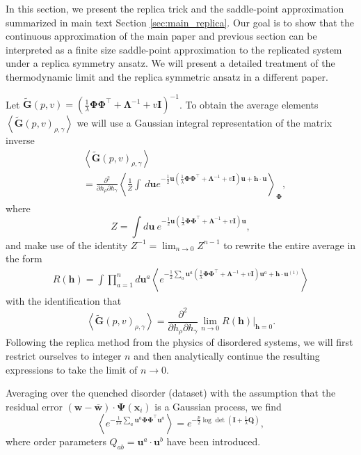 \documentclass{article}
\begin{document}
In this section, we present the replica trick and the saddle-point approximation summarized in main text Section \ref{sec:main_replica}. Our goal is to show that the continuous approximation of the main paper and previous section can be interpreted as a finite size saddle-point approximation to the replicated system under a replica symmetry ansatz. We will present a detailed treatment of the thermodynamic limit and the replica symmetric ansatz in a different paper.


Let $\mathbf{\tilde{G}}(p,v) = \left(\frac{1}{\lambda} \mathbf{\Phi} \mathbf{\Phi}^\top + \mathbf{\Lambda}^{-1} + v \mathbf{I} \right)^{-1}$. 
To obtain the average elements $\left< \mathbf{\tilde{G}}(p,v)_{\rho,\gamma} \right>$ we will use a Gaussian integral representation of the matrix inverse
\begin{align}
    &\left< \mathbf{\tilde{G}}(p,v)_{\rho,\gamma} \right> \nonumber\\
    &= \frac{\partial^2}{\partial h_\rho \partial h_\gamma} \left< \frac{1}{Z} \int \ d\mathbf{u}  e^{-\frac{1}{2} \mathbf{u}(\frac{1}{\lambda} \mathbf{\Phi}\mathbf{\Phi}^\top + \mathbf{\Lambda}^{-1} +v\mathbf{I}) \mathbf{u} + \mathbf{h} \cdot \mathbf{u}} \right>_{\mathbf{\Phi}},
\end{align}
%
where 
\begin{equation}
    Z = \int d\mathbf{u} \ e^{-\frac{1}{2} \mathbf{u}(\frac{1}{\lambda} \mathbf{\Phi}\mathbf{\Phi}^\top + \mathbf{\Lambda}^{-1} +v\mathbf{I}) \mathbf{u} },
\end{equation}
%
and make use of the identity $Z^{-1} = \lim_{n \to 0} Z^{n-1}$ to rewrite the entire average in the form
\begin{align}
    R(\mathbf{h}) = \int \prod_{a=1}^n d\mathbf{u}^a \left< e^{-\frac{1}{2} \sum_a \mathbf{u}^a(\frac{1}{\lambda} \mathbf{\Phi}\mathbf{\Phi}^\top + \mathbf{\Lambda}^{-1} +v\mathbf{I}) \mathbf{u}^a + \mathbf{h} \cdot \mathbf{u}^{(1)}} \right>
\end{align}
%
with the identification that 
\begin{equation}
    \left< \mathbf{\tilde{G}}(p,v)_{\rho,\gamma} \right> = \frac{\partial^2}{\partial h_\rho \partial h_\gamma}\lim_{n \to 0} R(\mathbf{h})|_{\mathbf{h}=0}.
\end{equation}
%
Following the replica method from the physics of disordered systems, we will first restrict ourselves to integer $n$ and then analytically continue the resulting expressions to take the limit of $n \to 0$. 

Averaging over the quenched disorder (dataset) with the assumption that the residual error $(\mathbf{w} - \mathbf{\overline{w}}) \cdot \mathbf{\Psi}(\mathbf{x}_i)$ is a Gaussian process, we find
\begin{equation}
    \left< e^{-\frac{1}{2 \lambda} \sum_a \mathbf{u}^a \mathbf{\Phi} \mathbf{\Phi}^\top \mathbf{u}^a } \right> = e^{- \frac{p}{2} \log \det(\mathbf{I}+\frac{1}{\lambda}\mathbf{Q})},
\end{equation}
%
where order parameters $Q_{ab} = \mathbf{u}^a \cdot \mathbf{u}^b$ have been introduced.
\end{document}
